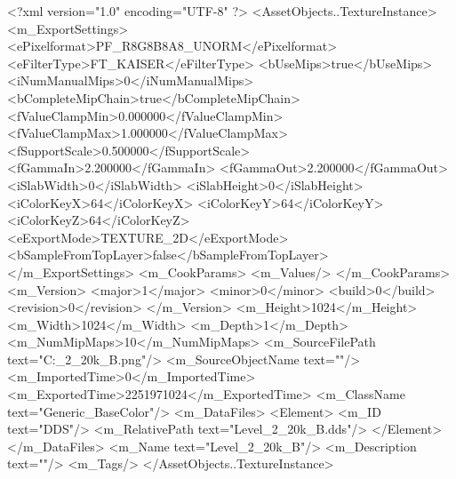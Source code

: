 <?xml version="1.0" encoding="UTF-8" ?>
<AssetObjects..TextureInstance>
	<m_ExportSettings>
		<ePixelformat>PF_R8G8B8A8_UNORM</ePixelformat>
		<eFilterType>FT_KAISER</eFilterType>
		<bUseMips>true</bUseMips>
		<iNumManualMips>0</iNumManualMips>
		<bCompleteMipChain>true</bCompleteMipChain>
		<fValueClampMin>0.000000</fValueClampMin>
		<fValueClampMax>1.000000</fValueClampMax>
		<fSupportScale>0.500000</fSupportScale>
		<fGammaIn>2.200000</fGammaIn>
		<fGammaOut>2.200000</fGammaOut>
		<iSlabWidth>0</iSlabWidth>
		<iSlabHeight>0</iSlabHeight>
		<iColorKeyX>64</iColorKeyX>
		<iColorKeyY>64</iColorKeyY>
		<iColorKeyZ>64</iColorKeyZ>
		<eExportMode>TEXTURE_2D</eExportMode>
		<bSampleFromTopLayer>false</bSampleFromTopLayer>
	</m_ExportSettings>
	<m_CookParams>
		<m_Values/>
	</m_CookParams>
	<m_Version>
		<major>1</major>
		<minor>0</minor>
		<build>0</build>
		<revision>0</revision>
	</m_Version>
	<m_Height>1024</m_Height>
	<m_Width>1024</m_Width>
	<m_Depth>1</m_Depth>
	<m_NumMipMaps>10</m_NumMipMaps>
	<m_SourceFilePath text="C:\Users\Shadow\Desktop\Prototypes\Level_2_20k_B.png"/>
	<m_SourceObjectName text=""/>
	<m_ImportedTime>0</m_ImportedTime>
	<m_ExportedTime>2251971024</m_ExportedTime>
	<m_ClassName text="Generic_BaseColor"/>
	<m_DataFiles>
		<Element>
			<m_ID text="DDS"/>
			<m_RelativePath text="Level_2_20k_B.dds"/>
		</Element>
	</m_DataFiles>
	<m_Name text="Level_2_20k_B"/>
	<m_Description text=""/>
	<m_Tags/>
</AssetObjects..TextureInstance>

